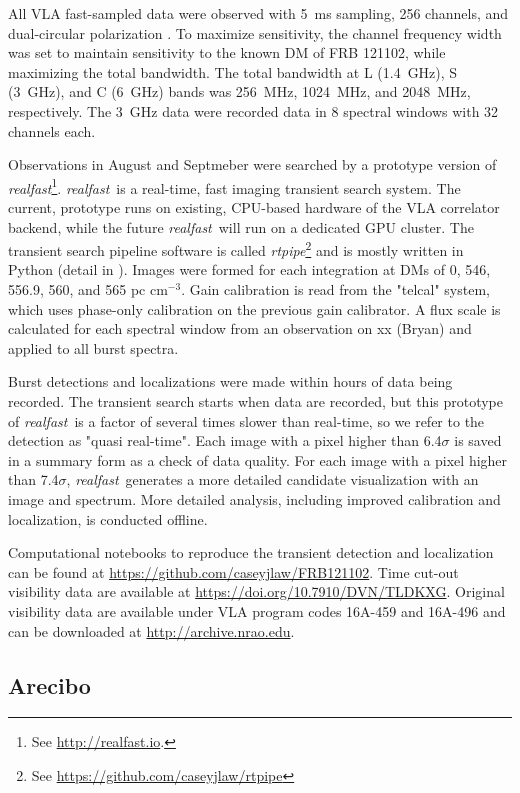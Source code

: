 \documentclass[twocolumn]{aastex61}
\newcommand{\rf}{\emph{realfast}}
\newcommand{\frb}{FRB 121102}
\begin{document}
All VLA fast-sampled data were observed with 5~ms sampling, 256 channels, and dual-circular polarization \citep[as in]{2015ApJ...807...16L}. To maximize sensitivity, the channel frequency width was set to maintain sensitivity to the known DM of \frb, while maximizing the total bandwidth. The total bandwidth at L (1.4~GHz), S (3~GHz), and C (6~GHz) bands was 256~MHz, 1024~MHz, and 2048~MHz, respectively. The 3~GHz data were recorded data in 8 spectral windows with 32 channels each.

Observations in August and Septmeber were searched by a prototype version of \rf\footnote{See \url{http://realfast.io}.}. \rf\ is a real-time, fast imaging transient search system. The current, prototype runs on existing, CPU-based hardware of the VLA correlator backend, while the future \rf\ will run on a dedicated GPU cluster. The transient search pipeline software is called \emph{rtpipe}\footnote{See \url{https://github.com/caseyjlaw/rtpipe}} and is mostly written in Python (detail in \citet{2015ApJ...807...16L}). Images were formed for each integration at DMs of 0, 546, 556.9, 560, and 565 pc cm$^{-3}$. Gain calibration is read from the "telcal" system, which uses phase-only calibration on the previous gain calibrator. A flux scale is calculated for each spectral window from an observation on {\color{red} xx (Bryan)} and applied to all burst spectra.

Burst detections and localizations were made within hours of data being recorded. The transient search starts when data are recorded, but this prototype of \rf\ is a factor of several times slower than real-time, so we refer to the detection as "quasi real-time". Each image with a pixel higher than 6.4$\sigma$ is saved in a summary form as a check of data quality. For each image with a pixel higher than 7.4$\sigma$, \rf\ generates a more detailed candidate visualization with an image and spectrum. More detailed analysis, including improved calibration and localization, is conducted offline. 

Computational notebooks to reproduce the transient detection and localization can be found at \url{https://github.com/caseyjlaw/FRB121102}. Time cut-out visibility data are available at \url{https://doi.org/10.7910/DVN/TLDKXG}. Original visibility data are available under VLA program codes 16A-459 and 16A-496 and can be downloaded at \url{http://archive.nrao.edu}.

\subsection{Arecibo}
\end{document}
